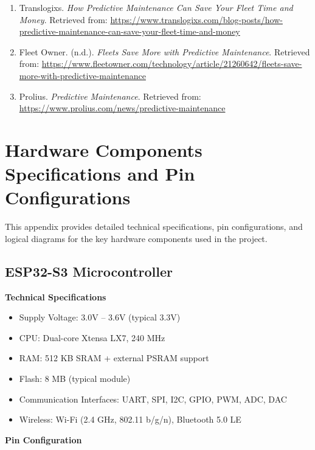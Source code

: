 \begin{enumerate}
    \item Translogixs. \textit{How Predictive Maintenance Can Save Your Fleet Time and Money}. Retrieved from: \url{https://www.translogixs.com/blog-posts/how-predictive-maintenance-can-save-your-fleet-time-and-money}
    
    \item Fleet Owner. (n.d.). \textit{Fleets Save More with Predictive Maintenance}. Retrieved from: \url{https://www.fleetowner.com/technology/article/21260642/fleets-save-more-with-predictive-maintenance}
    
    \item Prolius. \textit{Predictive Maintenance}. Retrieved from: \url{https://www.prolius.com/news/predictive-maintenance}
\end{enumerate}


\chapter{Hardware Components Specifications and Pin Configurations}

This appendix provides detailed technical specifications, pin configurations, and logical diagrams for the key hardware components used in the project.

\section{ESP32-S3 Microcontroller}

\textbf{Technical Specifications}
\begin{itemize}
    \item Supply Voltage: 3.0V – 3.6V (typical 3.3V)
    \item CPU: Dual-core Xtensa LX7, 240 MHz
    \item RAM: 512 KB SRAM + external PSRAM support
    \item Flash: 8 MB (typical module)
    \item Communication Interfaces: UART, SPI, I2C, GPIO, PWM, ADC, DAC
    \item Wireless: Wi-Fi (2.4 GHz, 802.11 b/g/n), Bluetooth 5.0 LE
\end{itemize}

\textbf{Pin Configuration}

